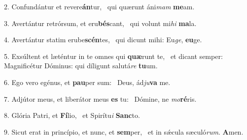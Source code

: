 2. Confundántur et revere\textbf{án}tur, \ast\  qui quærunt áni\textit{mam} \textbf{me}am.\

3. Avertántur retrórsum, et eru\textbf{bés}cant, \ast\  qui volunt mi\textit{hi} \textbf{ma}la.\

4. Avertántur statim erube\textbf{scén}tes, \ast\  qui dicunt mihi: Eu\textit{ge}, \textbf{eu}ge.\

5. Exsúltent et læténtur in te omnes qui \textbf{quæ}runt te, \ast\  et dicant semper: Magnificétur Dóminus: qui díligunt salutá\textit{re} \textbf{tu}um.\

6. Ego vero egénus, et \textbf{pau}per sum: \ast\  Deus, ád\textit{ju}\textbf{va} me.\

7. Adjútor meus, et liberátor meus \textbf{es} tu: \ast\  Dómine, ne \textit{mo}\textbf{ré}ris.\

8. Glória Patri, et \textbf{Fí}lio, \ast\  et Spirítu\textit{i} \textbf{Sanc}to.\

9. Sicut erat in princípio, et nunc, et \textbf{sem}per, \ast\  et in sǽcula sæculó\textit{rum}. \textbf{A}men.\

